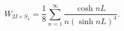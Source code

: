 \begin{equation}
W_{2I\times S_4}=\frac{1}{8}
\sum^\infty_{n=1}\frac{\cosh nL}{n(\sinh nL)^4}.
\end{equation}

